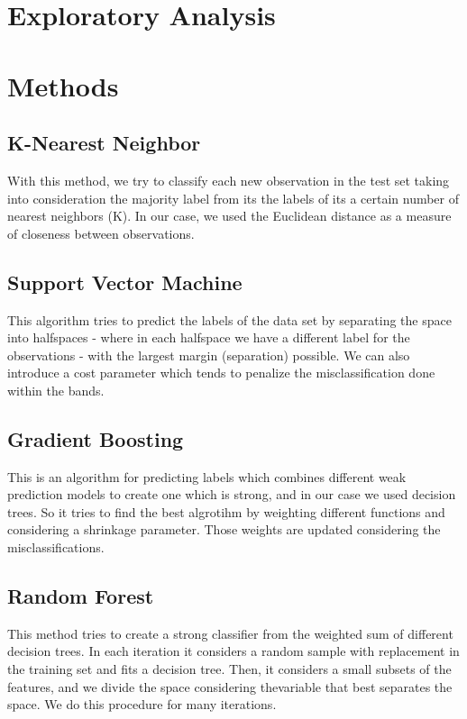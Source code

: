 \documentclass[paper=a4, fontsize=11pt]{scrartcl}
\numberwithin{equation}{section}
\numberwithin{figure}{section}
\numberwithin{table}{section}
\begin{document}

\section{Exploratory Analysis}





\section{Methods}
\subsection{K-Nearest Neighbor}
With this method, we try to classify each new observation in the test set taking into consideration the majority label from its the labels of its a certain number of nearest neighbors (K). In our case, we used the Euclidean distance as a measure of closeness between observations.


\subsection{Support Vector Machine}
This algorithm tries to predict the labels of the data set by separating the space into halfspaces - where in each halfspace we have a different label for the observations - with the largest margin (separation) possible. We can also introduce a cost parameter which tends to penalize the misclassification done within the bands. 

\subsection{Gradient Boosting}
This is an algorithm for predicting labels which combines different weak prediction models to create one which is strong, and in our case we used decision trees. So it tries to find the best algrotihm by weighting different functions and considering a shrinkage parameter. Those weights are updated considering the misclassifications. 

\subsection{Random Forest}
This method tries to create a strong classifier from the weighted sum of different decision trees. In each iteration it considers a random sample with replacement in the training set and fits a decision tree. Then, it considers a small subsets of the features, and we divide the space considering thevariable that best separates the space. We do this procedure for many iterations. 
\end{document}
